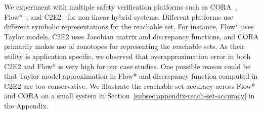 
We experiment with multiple safety verification platforms such as CORA~\cite{Althoff2018b}, Flow*~\cite{10.1007/978-3-642-39799-8_18}, and C2E2~\cite{Duggirala.2015} for non-linear hybrid systems. Different platforms use different symbolic representations for the reachable set. For instance, Flow* uses Taylor models, C2E2 uses Jacobian matrix and discrepancy functions, and CORA primarily makes use of zonotopes for representing the reachable sets. As their utility is application specific,  we observed that overapproximation error in both C2E2 and Flow* is very high for our case studies. One possible reason could be that Taylor model approximation in Flow* and discrepancy function computed in C2E2 are too conservative. We illustrate the  reachable set accuracy across Flow* and CORA on a small system in Section~\ref{subsec:appendix-reach-set-accuracy} in the Appendix.



%


